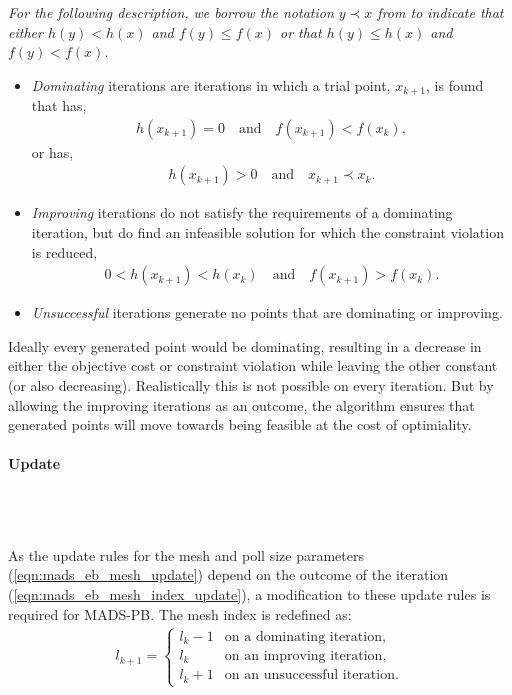 \textit{For the following description, we borrow the notation $y \prec x$ from \cite{Audet2009AProgramming} to indicate that either $h(y) < h(x)$ and $f(y)\leq f(x)$ or that $h(y)\leq h(x)$ and $f(y) < f(x)$.}
\begin{itemize}
    \item \textit{Dominating} iterations are iterations in which a trial point, $x_{k+1}$, is found that has,
    \begin{gather}
        h(x_{k+1})=0 \quad \text{and} \quad f(x_{k+1}) < f(x_k),
    \end{gather}
    or has,
    \begin{gather}
        h(x_{k+1})>0 \quad \text{and} \quad x_{k+1}\prec x_k.
    \end{gather}
    \item \textit{Improving} iterations do not satisfy the requirements of a dominating iteration, but do find an infeasible solution for which the constraint violation is reduced,
    \begin{gather}
        0 < h(x_{k+1}) < h(x_k) \quad \text{and} \quad f(x_{k+1}) > f(x_k).
    \end{gather}
    
    \item \textit{Unsuccessful} iterations generate no points that are dominating or improving.
\end{itemize}

Ideally every generated point would be dominating, resulting in a decrease in either the objective cost or constraint violation while leaving the other constant (or also decreasing). Realistically this is not possible on every iteration. But by allowing the improving iterations as an outcome, the algorithm ensures that generated points will move towards being feasible at the cost of optimiality.

\paragraph{Update}\\\

As the update rules for the mesh and poll size parameters (\ref{eqn:mads_eb_mesh_update}) depend on the outcome of the iteration (\ref{eqn:mads_eb_mesh_index_update}), a modification to these update rules is required for \ac{MADS-PB}. The mesh index is redefined as:
\begin{gather}\label{eqn:mads_pb_mesh_index_update}   
    l_{k+1} = 
        \begin{cases}
        l_k-1 & \text{on a dominating iteration},\\
        l_k   & \text{on an improving iteration},\\
        l_k+1 & \text{on an unsuccessful iteration}.
        \end{cases}
\end{gather}

